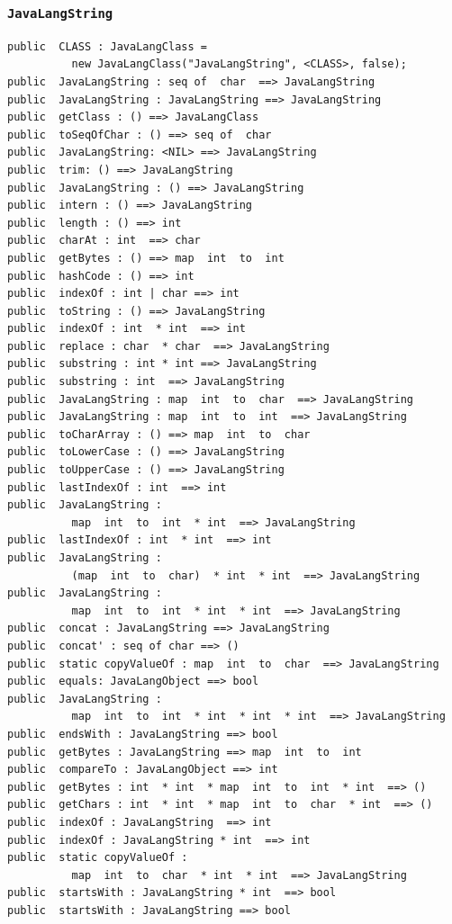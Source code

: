 \documentclass[\pformat,12pt]{article}
\begin{document}
\subsubsection{\texttt{JavaLangString}}
\begin{small}
\begin{verbatim}
public  CLASS : JavaLangClass =
          new JavaLangClass("JavaLangString", <CLASS>, false);
public  JavaLangString : seq of  char  ==> JavaLangString
public  JavaLangString : JavaLangString ==> JavaLangString
public  getClass : () ==> JavaLangClass
public  toSeqOfChar : () ==> seq of  char
public  JavaLangString: <NIL> ==> JavaLangString
public  trim: () ==> JavaLangString
public  JavaLangString : () ==> JavaLangString
public  intern : () ==> JavaLangString
public  length : () ==> int
public  charAt : int  ==> char
public  getBytes : () ==> map  int  to  int
public  hashCode : () ==> int
public  indexOf : int | char ==> int
public  toString : () ==> JavaLangString
public  indexOf : int  * int  ==> int
public  replace : char  * char  ==> JavaLangString
public  substring : int * int ==> JavaLangString
public  substring : int  ==> JavaLangString
public  JavaLangString : map  int  to  char  ==> JavaLangString
public  JavaLangString : map  int  to  int  ==> JavaLangString
public  toCharArray : () ==> map  int  to  char
public  toLowerCase : () ==> JavaLangString
public  toUpperCase : () ==> JavaLangString
public  lastIndexOf : int  ==> int
public  JavaLangString : 
          map  int  to  int  * int  ==> JavaLangString
public  lastIndexOf : int  * int  ==> int
public  JavaLangString : 
          (map  int  to  char)  * int  * int  ==> JavaLangString
public  JavaLangString : 
          map  int  to  int  * int  * int  ==> JavaLangString
public  concat : JavaLangString ==> JavaLangString
public  concat' : seq of char ==> ()
public  static copyValueOf : map  int  to  char  ==> JavaLangString
public  equals: JavaLangObject ==> bool
public  JavaLangString : 
          map  int  to  int  * int  * int  * int  ==> JavaLangString
public  endsWith : JavaLangString ==> bool
public  getBytes : JavaLangString ==> map  int  to  int
public  compareTo : JavaLangObject ==> int
public  getBytes : int  * int  * map  int  to  int  * int  ==> ()
public  getChars : int  * int  * map  int  to  char  * int  ==> ()
public  indexOf : JavaLangString  ==> int
public  indexOf : JavaLangString * int  ==> int
public  static copyValueOf : 
          map  int  to  char  * int  * int  ==> JavaLangString
public  startsWith : JavaLangString * int  ==> bool
public  startsWith : JavaLangString ==> bool

\end{verbatim}
\end{small}
\end{document}

